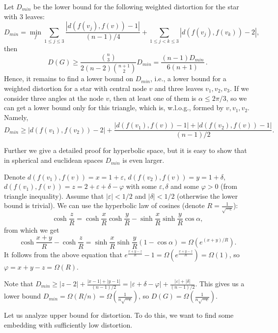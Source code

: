 \documentclass{article} %
\begin{document}
Let $D_{min}$ be the lower bound for the following weighted distortion for the star with 3 leaves:
\[
D_{min} = \min_{f} \sum_{1\le j \le 3}  \frac{|d(f(v_j),f(v)) - 1|}{(n-1)/4} +
\sum_{1\le j < k\le 3}  |d(f(v_j),f(v_k)) - 2|,
\]
then 
\[
D(G) \ge \frac{{n\choose 3}}{2(n-2){n+1 \choose 2}} D_{min} = \frac{ (n-1)D_{min}}{6(n+1)}\,.
\]
Hence, it remains to find a lower bound on $D_{min}$, i.e., a lower bound for a weighted distortion for a star with central node $v$ and three leaves $v_1, v_2, v_3$.
If we consider three angles at the node $v$, then at least one of them is $\alpha \le 2 \pi / 3$, so we can get a lower bound only for this triangle, which is, w.l.o.g., formed by $v, v_1, v_2$.  Namely,
\[
D_{min} \ge  |d(f(v_1),f(v_2)) - 2| + \frac{|d(f(v_1),f(v)) - 1| + |d(f(v_2),f(v)) - 1|}{(n-1)/2} .
\]


Further we give a detailed proof for hyperbolic space, but it is easy to show that in spherical and euclidean spaces $D_{min}$ is even larger.

Denote $d(f(v_1),f(v)) = x = 1 + \varepsilon$, $d(f(v_2),f(v)) = y = 1 + \delta$, $d(f(v_1),f(v)) = z = 2 + \varepsilon + \delta - \varphi$ with some $\varepsilon, \delta$ and some $\varphi > 0$ (from triangle inequality). Assume that $|\varepsilon| < 1/2$ and $|\delta| < 1/2$ (otherwise the lower bound is trivial). We can use the hyperbolic law of cosines (denote $R = \frac{1}{\sqrt{-c}}$):
\[
\cosh \frac{z}{R} = \cosh \frac{x}{R} \cosh \frac{y}{R} - \sinh \frac{x}{R} \sinh \frac{y}{R} \cos \alpha,
\]
from which we get 
\[
\cosh \frac{x+y}{R} - \cosh \frac{z}{R} = \sinh \frac{x}{R} \sinh \frac{y}{R} (1 - \cos \alpha) = \Omega\left(e^{(x+y)/R}\right).
\]
It follows from the above equation that 
$e^{\frac{x+y-z}{R}} - 1 = \Omega\left(e^{\frac{x+y-z}{R}}\right) = \Omega(1)$, so $\varphi = x + y - z = \Omega(R)$.

Note that $D_{min} \ge |z-2| + \frac{|x-1| + |y-1|}{(n-1)/2} =  |\varepsilon + \delta - \varphi| + \frac{|\varepsilon| + |\delta|}{(n-1)/2}$. This gives us a lower bound $D_{min} = \Omega(R/n) = \Omega\left(\frac{1}{n\sqrt{-c}}\right)$, so $D(G) =  \Omega\left(\frac{1}{n\sqrt{-c}}\right)$.

Let us analyze upper bound for distortion. To do this, we want to find some embedding with sufficiently low distortion. 

\end{document}
